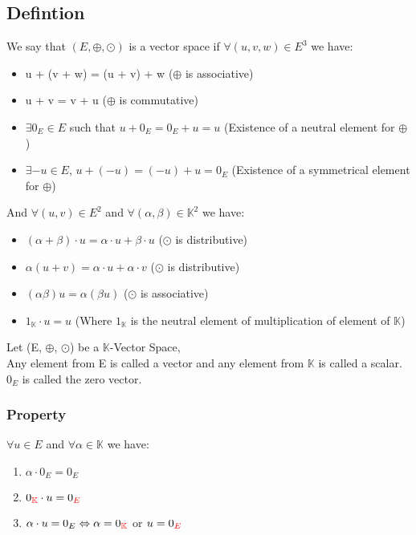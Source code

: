 \documentclass[notitlepage]{math}
\begin{document}
\subsection{Defintion}
\noindent We say that $(E, \oplus, \odot)$ is a vector space if $\forall (u,v,w) \in E^3$ we have:
\begin{itemize}
    \item u + (v + w) = (u + v) + w {\color{green}($\oplus$ is associative)}
    \item u + v = v + u {\color{green}($\oplus$ is commutative)}
    \item $\exists 0_E \in E$ such that $u + 0_E = 0_E + u = u$ {\color{green}(Existence of a neutral element for $\oplus$)}
    \item $\exists \minus u \in E$, $u + (\minus u) = (\minus u) + u = 0_E$ {\color{green}(Existence of a symmetrical element for $\oplus$)}
\end{itemize}
And $\forall (u, v) \in E^2$ and $\forall (\alpha, \beta) \in \mathbb{K}^2$ we have:
\begin{itemize}
    \item $(\alpha + \beta) \cdot u = \alpha \cdot u + \beta \cdot u$ {\color{green}($\odot$ is distributive)}
    \item $\alpha (u + v) = \alpha \cdot u + \alpha \cdot v$ {\color{green}($\odot$ is distributive)}
    \item $(\alpha \beta) u = \alpha (\beta u)$ {\color{green}($\odot$ is associative)}
    \item $1_{\mathbb{K}} \cdot u = u$ {\color{green}(Where $1_{\mathbb{K}}$ is the neutral element of multiplication of element of $\mathbb{K}$)}
\end{itemize}
Let (E, $\oplus$, $\odot$) be a $\mathbb{K}$-Vector Space,\\
Any element from E is called a vector and any element from $\mathbb{K}$ is called a scalar.\\
$0_E$ is called the zero vector.\\
\subsubsection{Property}
$\forall u \in E$ and $\forall \alpha \in \mathbb{K}$ we have:
\begin{enumerate}
    \item $\alpha \cdot 0_E = 0_E$
    \item $0_{\color{red}\mathbb{K}} \cdot u = 0_{\color{red}E}$
    \item $\alpha \cdot u = 0_E \Leftrightarrow \alpha = 0_{\color{red}\mathbb{K}}$ or $u = 0_{\color{red}E}$
\end{enumerate}
\end{document}
